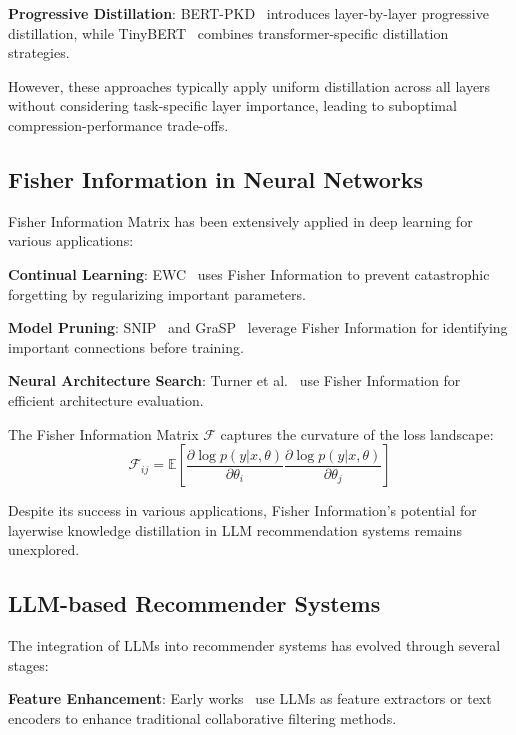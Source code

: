 \documentclass[10pt,conference]{IEEEtran}
\newcommand{\fisher}{\mathcal{F}}
\begin{document}
\textbf{Progressive Distillation}: BERT-PKD~\cite{sun2019patient} introduces layer-by-layer progressive distillation, while TinyBERT~\cite{jiao2019tinybert} combines transformer-specific distillation strategies.

However, these approaches typically apply uniform distillation across all layers without considering task-specific layer importance, leading to suboptimal compression-performance trade-offs.

\subsection{Fisher Information in Neural Networks}

Fisher Information Matrix has been extensively applied in deep learning for various applications:

\textbf{Continual Learning}: EWC~\cite{kirkpatrick2017overcoming} uses Fisher Information to prevent catastrophic forgetting by regularizing important parameters.

\textbf{Model Pruning}: SNIP~\cite{lee2018snip} and GraSP~\cite{wang2020picking} leverage Fisher Information for identifying important connections before training.

\textbf{Neural Architecture Search}: Turner et al.~\cite{turner2019blockwise} use Fisher Information for efficient architecture evaluation.

The Fisher Information Matrix $\fisher$ captures the curvature of the loss landscape:
\begin{equation}
\fisher_{ij} = \mathbb{E}\left[\frac{\partial \log p(y|x,\theta)}{\partial \theta_i} \frac{\partial \log p(y|x,\theta)}{\partial \theta_j}\right]
\end{equation}

Despite its success in various applications, Fisher Information's potential for layerwise knowledge distillation in LLM recommendation systems remains unexplored.

\subsection{LLM-based Recommender Systems}

The integration of LLMs into recommender systems has evolved through several stages:

\textbf{Feature Enhancement}: Early works~\cite{hou2022towards,zhang2021neural} use LLMs as feature extractors or text encoders to enhance traditional collaborative filtering methods.
\end{document}
